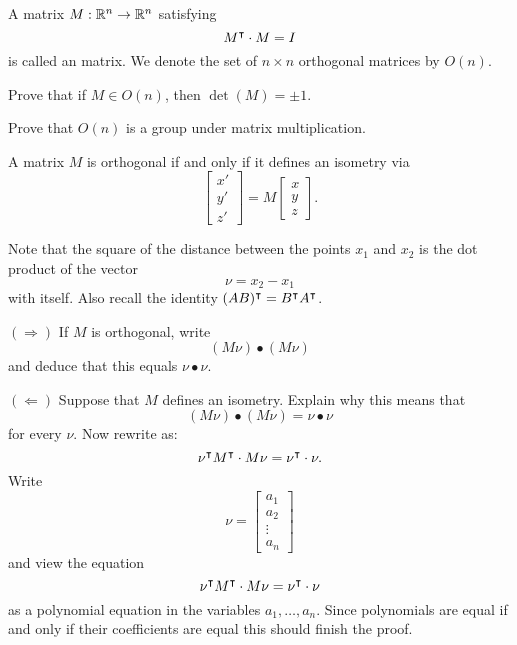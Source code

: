 \documentclass{ximera}
\begin{document}
\begin{definition}
  A matrix $M:\mathbb R^n\to \mathbb R^n$ satisfying
  \[
  M^\intercal \cdot M=I
  \]
  is called an  matrix. We denote the set of $n\times
  n$ orthogonal matrices by $O(n)$.
\end{definition}


\begin{exercise}
  Prove that if $M\in O(n)$, then $\det(M) = \pm 1$.
\end{exercise}


\begin{exercise}
  Prove that $O(n)$ is a group under matrix multiplication.
\end{exercise}




\begin{lemma}
  A matrix $M$ is orthogonal if and only if it defines an isometry via
  \[
  \begin{bmatrix}
    x' \\ y' \\ z'
  \end{bmatrix}
  = M \begin{bmatrix} x \\ y \\ z\end{bmatrix}.
  \]
  \begin{sketch}
    Note that the square of the distance between the points $x_{1}$
    and $x_{2}$ is the dot product of the vector%
    \[
    \nu=x_{2}-x_{1}%
    \]
    with itself.  Also recall the identity
    $(AB)^\intercal=B^\intercal A^\intercal$.
    
    $(\Rightarrow)$ If $M$ is orthogonal, write
    \[
    (M\nu) \bullet (M\nu)
    \]
    and deduce that this equals ${\nu}\bullet{\nu}$.

    $(\Leftarrow)$ Suppose that $M$ defines an isometry. Explain why
    this means that
    \[
    ( M{\nu}) \bullet ( M{\nu})=
    {\nu} \bullet {\nu}
    \]
    for every ${\nu}$.  Now rewrite as:
    \[
    \nu^\intercal M^\intercal \cdot M\nu=\nu^\intercal
    \cdot{\nu}.
    \]
    Write
    \[
    {\nu} =
    \begin{bmatrix}
      a_1 \\ a_2 \\ \vdots \\ a_n
    \end{bmatrix}
    \]
     and view the equation 
    \[
    \nu^\intercal M^\intercal \cdot M\nu=\nu^\intercal
    \cdot{\nu}
    \]
    as a polynomial equation in the variables $a_1,\dots,a_n$. Since
    polynomials are equal if and only if their coefficients are equal
    this should finish the proof.
  \end{sketch}
\end{lemma}
\end{document}
